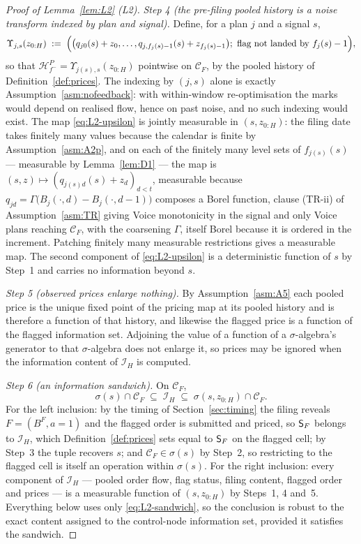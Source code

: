 \begin{proof}[Proof of Lemma~\ref{lem:L2} (L2)]
\emph{Step 4 (the pre-filing pooled history is a noise transform indexed by plan and signal).}
Define, for a plan $j$ and a signal $s$,
\begin{equation}
\label{eq:L2-upsilon}
\Upsilon_{j,s}(z_{0:H}) \;:=\;
  \Bigl( \bigl(q_{j0}(s)+z_0,\dots,q_{j,f_j(s)-1}(s)+z_{f_j(s)-1}\bigr);\ \text{flag not landed by }
  f_j(s)-1 \Bigr),
\end{equation}
so that $\mathcal H_{f^-}^P = \Upsilon_{j(s),s}(z_{0:H})$ pointwise on $\mathcal C_F$, by the pooled
history of Definition~\ref{def:prices}. The indexing by $(j,s)$ alone is exactly
Assumption~\ref{asm:nofeedback}: with within-window re-optimisation the marks would depend on
realised flow, hence on past noise, and no such indexing would exist. The map
\eqref{eq:L2-upsilon} is jointly measurable in $(s,z_{0:H})$: the filing date takes finitely many
values because the calendar is finite by Assumption~\ref{asm:A2p}, and on each of the finitely many
level sets of $f_{j(s)}(s)$ --- measurable by Lemma~\ref{lem:D1} --- the map is
$(s,z) \mapsto (q_{j(s)d}(s)+z_d)_{d<t}$, measurable because
$q_{jd} = \Gamma\bigl(B_j(\cdot,d)-B_j(\cdot,d-1)\bigr)$ composes a Borel function, clause (TR-ii) of
Assumption~\ref{asm:TR} giving Voice monotonicity in the signal and only Voice plans reaching
$\mathcal C_F$, with the coarsening $\Gamma$, itself Borel because it is ordered in the increment.
Patching finitely many measurable restrictions gives a measurable map. The second component of
\eqref{eq:L2-upsilon} is a deterministic function of $s$ by Step~1 and carries no information beyond
$s$.

\emph{Step 5 (observed prices enlarge nothing).} By Assumption~\ref{asm:A5} each pooled price is the
unique fixed point of the pricing map at its pooled history and is therefore a function of that
history, and likewise the flagged price is a function of the flagged information set. Adjoining the
value of a function of a $\sigma$-algebra's generator to that $\sigma$-algebra does not enlarge it,
so prices may be ignored when the information content of $\mathcal I_H$ is computed.

\emph{Step 6 (an information sandwich).} On $\mathcal C_F$,
\begin{equation}
\label{eq:L2-sandwich}
\sigma(s) \cap \mathcal C_F \;\subseteq\; \mathcal I_H \;\subseteq\;
  \sigma(s,z_{0:H}) \cap \mathcal C_F .
\end{equation}
For the left inclusion: by the timing of Section~\ref{sec:timing} the filing reveals
$F = (B^F,a{=}1)$ and the flagged order is submitted and priced, so $\mathsf{S}_F$ belongs to $\mathcal I_H$,
which Definition~\ref{def:prices} sets equal to $\mathsf{S}_F$ on the flagged cell; by Step~3 the tuple
recovers $s$; and $\mathcal C_F \in \sigma(s)$ by Step~2, so restricting to the flagged cell is
itself an operation within $\sigma(s)$. For the right inclusion: every component of $\mathcal I_H$
--- pooled order flow, flag status, filing content, flagged order and prices --- is a measurable
function of $(s,z_{0:H})$ by Steps~1, 4 and~5. Everything below uses only
\eqref{eq:L2-sandwich}, so the conclusion is robust to the exact content assigned to the
control-node information set, provided it satisfies the sandwich.


\end{proof}

